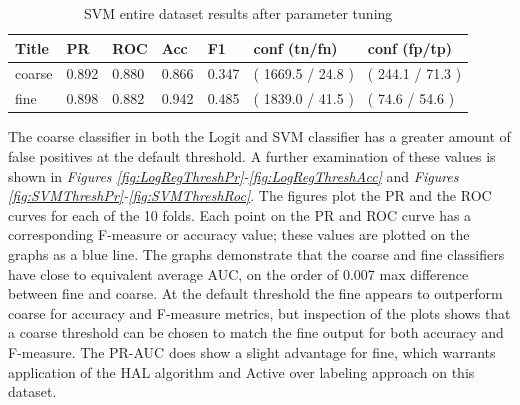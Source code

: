 \documentclass[ms]{nuthesis}
\begin{document}
\FloatBarrier
\begin{table}[H]
\centering
\caption{SVM entire dataset results after parameter tuning}
\label{tab:SVM-All}
\begin{tabular}{|l||l||l||l||l||l||l|}\toprule
Title & PR & ROC & Acc & F1 & conf (tn/fn) & conf (fp/tp) \\ \midrule
coarse & 0.892 & 0.880 & 0.866 & 0.347 & ( 1669.5 / 24.8 ) & ( 244.1 / 71.3 ) \\
fine & 0.898 & 0.882 & 0.942 & 0.485 & ( 1839.0 / 41.5 ) & ( 74.6 / 54.6 ) \\ \bottomrule
\end{tabular}
\end{table}
\FloatBarrier

\par The coarse classifier in both the Logit and SVM classifier has a greater
 amount of false positives at the default threshold. A further examination of these
 values is shown in \textit{Figures \ref{fig:LogRegThreshPr}-\ref{fig:LogRegThreshAcc}}
  and \textit{Figures \ref{fig:SVMThreshPr}-\ref{fig:SVMThreshRoc}}. The figures plot the PR and the ROC
 curves for each of the 10 folds. Each point on the PR and ROC curve has a
 corresponding F-measure or accuracy value; these values are plotted on the graphs
 as a blue line. The graphs demonstrate that the coarse and fine classifiers have close
 to equivalent average AUC, on the order of 0.007 max difference between fine and coarse.
  At the default threshold the fine appears to outperform coarse for accuracy and F-measure
  metrics, but inspection of the plots shows that a coarse threshold can be chosen to match the fine output for
 both accuracy and F-measure. The PR-AUC does show a slight advantage for fine,
 which warrants application of the HAL algorithm and Active over labeling approach on this dataset.
\end{document}
